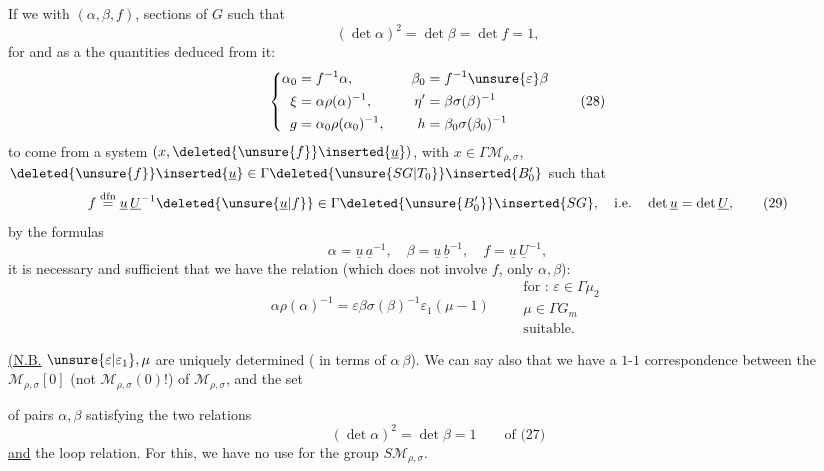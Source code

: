 If we  with $(\alpha,\beta,f)$\deleted{$\unsure{\in}$}, sections of $G$ such that
\[
(\det\alpha)^2=\det\beta=\det f=1,\tag{27}
\]
for   and as a  the quantities deduced from it: 
\[
\left\{
\begin{aligned}
\alpha_0&=f^{-1}\alpha,&\quad \beta_0&=f^{-1}\unsure{\varepsilon}\beta\\
\xi&=\alpha\rho(\alpha)^{-1},&\quad \eta'&=\beta\sigma(\beta)^{-1}\\
g&=\alpha_0\rho(\alpha_0)^{-1},&\quad h&=\beta_0\sigma(\beta_0)^{-1}
\end{aligned}
\right.\tag{28}
\]
to come from a system $(x,\deleted{\unsure{f}}\inserted{\underline u})$,
with $x\in\Gamma\mathcal M_{\rho,\sigma}$,
$\deleted{\unsure{f}}\inserted{\underline u}\in\Gamma\deleted{\unsure{SG|T_0}}\inserted{B'_0}$ such that
\[
f\overset{\mathrm{dfn}}{=}\underline u\,\underline U^{-1}
\deleted{\unsure{\underline u|f}}
\in\Gamma\deleted{\unsure{B'_0}}\inserted{SG},
\quad\text{i.e.}\quad\det\underline u=\det\underline U,
\tag{29}
\]
by the formulas
\[
\alpha=\underline u\,\underline a^{-1},\quad
\beta=\underline u\,\underline b^{-1},\quad
f=\underline u\,\underline U^{-1},\tag{30}
\]
it is necessary and sufficient that we have the relation (which does not involve $f$, only $\alpha,\beta$):
\[
\alpha\rho(\alpha)^{-1}=\varepsilon\beta\sigma(\beta)^{-1}\varepsilon_1(\mu-1)
\qquad
\begin{gathered}
\text{for : }\varepsilon\in\Gamma\mu_2\\
\mu\in\Gamma G_m\\
\text{suitable.}
\end{gathered}\tag{31}
\]

\uline{(N.B.} $\unsure{\varepsilon|\varepsilon_1},\mu$ are uniquely determined ( in terms of $\alpha\ \beta$).
We can say  also that we have a $1$-$1$ correspondence between the   $\mathcal M_{\rho,\sigma}[0]$ (not $\mathcal M_{\rho,\sigma}(0)$!) of $\mathcal M_{\rho,\sigma}$, and the set



of pairs $\alpha,\beta$ satisfying the two relations
\[
(\det\alpha)^2=\det\beta=1\qquad\text{of (27)}
\]
\uline{and} the loop relation. For this, we have  no use for the group $S\mathcal M_{\rho,\sigma}$.

